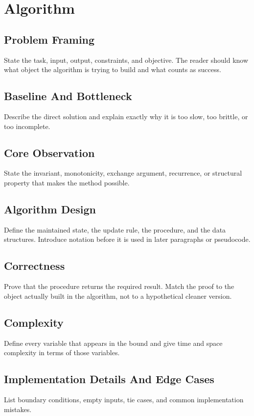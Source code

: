 \section{Algorithm}

\subsection{Problem Framing}
State the task, input, output, constraints, and objective. The reader should know what object the algorithm is trying to build and what counts as success.

\subsection{Baseline And Bottleneck}
Describe the direct solution and explain exactly why it is too slow, too brittle, or too incomplete.

\subsection{Core Observation}
State the invariant, monotonicity, exchange argument, recurrence, or structural property that makes the method possible.

\subsection{Algorithm Design}
Define the maintained state, the update rule, the procedure, and the data structures. Introduce notation before it is used in later paragraphs or pseudocode.

\subsection{Correctness}
Prove that the procedure returns the required result. Match the proof to the object actually built in the algorithm, not to a hypothetical cleaner version.

\subsection{Complexity}
Define every variable that appears in the bound and give time and space complexity in terms of those variables.

\subsection{Implementation Details And Edge Cases}
List boundary conditions, empty inputs, tie cases, and common implementation mistakes.
